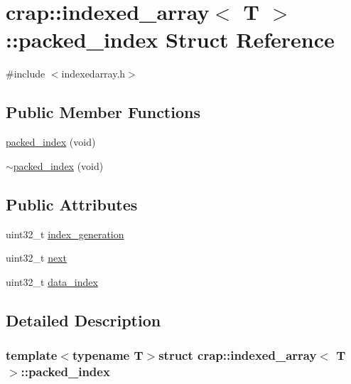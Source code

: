 \hypertarget{structcrap_1_1indexed__array_1_1packed__index}{\section{crap\+:\+:indexed\+\_\+array$<$ T $>$\+:\+:packed\+\_\+index Struct Reference}
\label{structcrap_1_1indexed__array_1_1packed__index}
}


{\ttfamily \#include $<$indexedarray.\+h$>$}

\subsection*{Public Member Functions}
\begin{DoxyCompactItemize}
\item 
\hyperlink{structcrap_1_1indexed__array_1_1packed__index_a7dae6808a23151767e44afbf706ecaad}{packed\+\_\+index} (void)
\item 
\hyperlink{structcrap_1_1indexed__array_1_1packed__index_af483e21ceab48d4b09e17dfad56fd6bc}{$\sim$packed\+\_\+index} (void)
\end{DoxyCompactItemize}
\subsection*{Public Attributes}
\begin{DoxyCompactItemize}
\item 
uint32\+\_\+t \hyperlink{structcrap_1_1indexed__array_1_1packed__index_af5423207ebc6a3cbf46e5689d840e2af}{index\+\_\+generation}
\item 
uint32\+\_\+t \hyperlink{structcrap_1_1indexed__array_1_1packed__index_a790171618ecc2fe9aa6b1b7526c43201}{next}
\item 
uint32\+\_\+t \hyperlink{structcrap_1_1indexed__array_1_1packed__index_a743ddc52af6d873167476bbca9fc23a8}{data\+\_\+index}
\end{DoxyCompactItemize}


\subsection{Detailed Description}
\subsubsection*{template$<$typename T$>$struct crap\+::indexed\+\_\+array$<$ T $>$\+::packed\+\_\+index}



